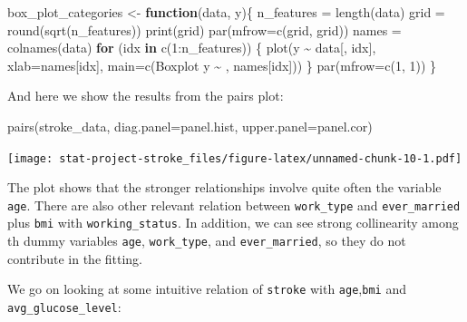 \documentclass[
]{article}
\newenvironment{Shaded}{\begin{snugshade}}{\end{snugshade}}
\newcommand{\AttributeTok}[1]{\textcolor[rgb]{0.77,0.63,0.00}{#1}}
\newcommand{\ControlFlowTok}[1]{\textcolor[rgb]{0.13,0.29,0.53}{\textbf{#1}}}
\newcommand{\DecValTok}[1]{\textcolor[rgb]{0.00,0.00,0.81}{#1}}
\newcommand{\FunctionTok}[1]{\textcolor[rgb]{0.00,0.00,0.00}{#1}}
\newcommand{\NormalTok}[1]{#1}
\newcommand{\OtherTok}[1]{\textcolor[rgb]{0.56,0.35,0.01}{#1}}
\newcommand{\SpecialCharTok}[1]{\textcolor[rgb]{0.00,0.00,0.00}{#1}}
\newcommand{\StringTok}[1]{\textcolor[rgb]{0.31,0.60,0.02}{#1}}
\begin{document}
\begin{Shaded}
\begin{Highlighting}[]
\NormalTok{box\_plot\_categories }\OtherTok{\textless{}{-}} \ControlFlowTok{function}\NormalTok{(data, y)\{}
\NormalTok{  n\_features }\OtherTok{=} \FunctionTok{length}\NormalTok{(data)}
\NormalTok{  grid }\OtherTok{=} \FunctionTok{round}\NormalTok{(}\FunctionTok{sqrt}\NormalTok{(n\_features))}
  \FunctionTok{print}\NormalTok{(grid)}
  \FunctionTok{par}\NormalTok{(}\AttributeTok{mfrow=}\FunctionTok{c}\NormalTok{(grid, grid))}
\NormalTok{  names }\OtherTok{=} \FunctionTok{colnames}\NormalTok{(data)}
  \ControlFlowTok{for}\NormalTok{ (idx }\ControlFlowTok{in} \FunctionTok{c}\NormalTok{(}\DecValTok{1}\SpecialCharTok{:}\NormalTok{n\_features)) \{}
    \FunctionTok{plot}\NormalTok{(y }\SpecialCharTok{\textasciitilde{}}\NormalTok{ data[, idx], }\AttributeTok{xlab=}\NormalTok{names[idx], }\AttributeTok{main=}\FunctionTok{c}\NormalTok{(}\StringTok{\textquotesingle{}Boxplot y \textasciitilde{} \textquotesingle{}}\NormalTok{, names[idx]))}
\NormalTok{  \}}
  \FunctionTok{par}\NormalTok{(}\AttributeTok{mfrow=}\FunctionTok{c}\NormalTok{(}\DecValTok{1}\NormalTok{, }\DecValTok{1}\NormalTok{))}
\NormalTok{\}}
\end{Highlighting}
\end{Shaded}

And here we show the results from the pairs plot:

\begin{Shaded}
\begin{Highlighting}[]
\FunctionTok{pairs}\NormalTok{(stroke\_data, }\AttributeTok{diag.panel=}\NormalTok{panel.hist, }\AttributeTok{upper.panel=}\NormalTok{panel.cor)}
\end{Highlighting}
\end{Shaded}

\texttt{[image: stat-project-stroke\_files/figure-latex/unnamed-chunk-10-1.pdf]}

The plot shows that the stronger relationships involve quite often the
variable \texttt{age}. There are also other relevant relation between
\texttt{work\_type} and \texttt{ever\_married} plus \texttt{bmi} with
\texttt{working\_status}. In addition, we can see strong collinearity
among th dummy variables \texttt{age}, \texttt{work\_type}, and
\texttt{ever\_married}, so they do not contribute in the fitting.

We go on looking at some intuitive relation of \texttt{stroke} with
\texttt{age},\texttt{bmi} and \texttt{avg\_glucose\_level}:
\end{document}

